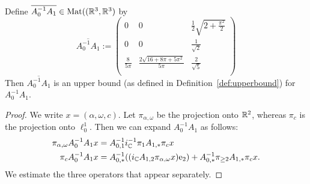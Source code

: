\begin{proposition}
		\label{prop:A0A1}
		Define $\overline{A_0^{-1} A_1 } \in \text{\textup{Mat}}((\mathbb{R}^3,\mathbb{R}^3)$ by
	\[
\overline{A_0^{-1} A_1 } :=
\left(
\begin{array}{ccc}
0 & 0 & \tfrac{1}{2}\sqrt{2+\frac{\pi ^2}{2}} \\
0 & 0 & \frac{1}{\sqrt{2}}  \\
\frac{8}{5 \pi } & \frac{2\sqrt{16+8 \pi +5 \pi ^2}}{5 \pi } & \frac{2}{\sqrt{5}} \\
\end{array}
\right)
	\] 
	Then $\overline{A_0^{-1} A_1 } $ is an upper bound (as defined in Definition~\ref{def:upperbound}) for $A_0^{-1} A_1 $.
\end{proposition}
\begin{proof}
We write $x=(\alpha,\omega,c)$.
Let $\pi_{\alpha,\omega}$ be the projection onto $\mathbb{R}^2$, whereas $\pi_c$ is the projection onto $\ell^1_0$. 
Then we can expand $  A_0^{-1} A_1 $ as follows:
\begin{alignat}{1}
  \pi_{\alpha,\omega} A_0^{-1} A_1 x &=   A_{0,1}^{-1}  i_{\mathbb{C}}^{-1} \pi_{1} A_{1,*} \pi_c x  \label{e:complicated1} \\
  \pi_{c} A_0^{-1} A_1 x  &= 
  A_{0,*}^{-1} (( i_{\mathbb{C}} A_{1,2} \pi_{\alpha,\omega} x)   \mathrm{e}_2 ) + A_{0,*}^{-1} \pi_{\geq 2} A_{1,*} \pi_c x . \label{e:complicated2}
\end{alignat}
We estimate the three operators that appear separately.


\end{proof}
